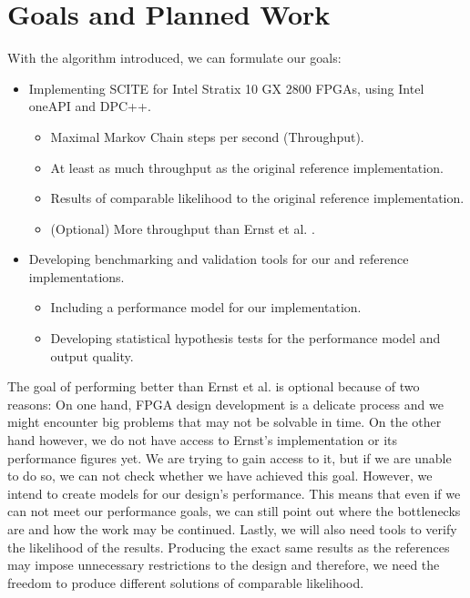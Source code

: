 \section{Goals and Planned Work}

With the algorithm introduced, we can formulate our goals:
\begin{itemize}
    \item Implementing \ac{SCITE} for Intel Stratix 10 GX 2800 \acp{FPGA}, using Intel oneAPI and DPC++.
    \begin{itemize}
        \item Maximal Markov Chain steps per second (Throughput).
        \item At least as much throughput as the original reference implementation.
        \item Results of comparable likelihood to the original reference implementation.
        \item (Optional) More throughput than Ernst et al. \cite{ernst2020Performance}.
    \end{itemize}
    \item Developing benchmarking and validation tools for our and reference implementations.
    \begin{itemize}
        \item Including a performance model for our implementation.
        \item Developing statistical hypothesis tests for the performance model and output quality.
    \end{itemize}
\end{itemize}

The goal of performing better than Ernst et al. is optional because of two reasons: On one hand, \ac{FPGA} design development is a delicate process and we might encounter big problems that may not be solvable in time. On the other hand however, we do not have access to Ernst's implementation or its performance figures yet. We are trying to gain access to it, but if we are unable to do so, we can not check whether we have achieved this goal. However, we intend to create models for our design's performance. This means that even if we can not meet our performance goals, we can still point out where the bottlenecks are and how the work may be continued. Lastly, we will also need tools to verify the likelihood of the results. Producing the exact same results as the references may impose unnecessary restrictions to the design and therefore, we need the freedom to produce different solutions of comparable likelihood.

